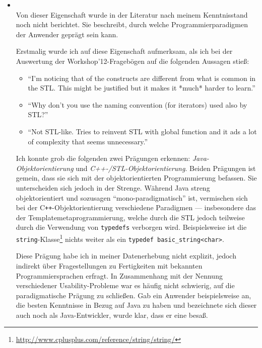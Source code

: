 \begin{itemize}
  \item[\codebullet{apiua://code/-9223372036854775494}] \textbf{}\label{sec:paradigmatische-pragung} \\
  Von dieser Eigenschaft wurde in der Literatur nach meinem Kenntnisstand noch nicht berichtet. Sie beschreibt, durch welche Programmierparadigmen der Anwender geprägt sein kann.
  
  Erstmalig wurde ich auf diese Eigenschaft aufmerksam, als ich bei der Auswertung der Workshop'12-Fragebögen auf die folgenden Aussagen stieß:
  \begin{itemize}
    \item ``I’m noticing that of the constructs are different from what is common in the STL. This might be justified but it makes it *much* harder to learn.''
    \item ``Why don't you use the naming convention (for iterators) used also by STL?''
    \item ``Not STL-like. Tries to reinvent STL with global function and it ads a lot of complexity that seems unnecessary.''
  \end{itemize}

  
  Ich konnte grob die folgenden zwei Prägungen erkennen: \textit{Java-Objektorientierung} und \textit{C++-/STL-Objektorientierung}. Beiden Prägungen ist gemein, dass sie sich mit der objektorientierten Programmierung befassen. Sie unterscheiden sich jedoch in der Strenge. Während Java streng objektorientiert und sozusagen ``mono-paradigmatisch'' ist, vermischen sich bei der C{}\verb!++!-Objektorientierung verschiedene Paradigmen --- insbesondere das der Templatemetaprogrammierung, welche durch die STL jedoch teilweise durch die Verwendung von \texttt{typedefs} verborgen wird. Beispielsweise ist die \texttt{string}-Klasse\footnote{\url{http://www.cplusplus.com/reference/string/string/}} nichts weiter als ein \texttt{typedef basic_string<char>}.
  
  Diese Prägung habe ich in meiner Datenerhebung nicht explizit, jedoch indirekt über Fragestellungen zu Fertigkeiten mit bekannten Programmiersprachen erfragt. In Zusammenhang mit der Nennung verschiedener Usability-Probleme war es häufig nicht schwierig, auf die paradigmatische Prägung zu schließen. Gab ein Anwender beispielsweise an, die besten Kenntnisse in Bezug auf Java zu haben und bezeichnete sich dieser auch noch als Java-Entwickler, wurde klar, dass er eine  besaß.
  

\end{itemize}
